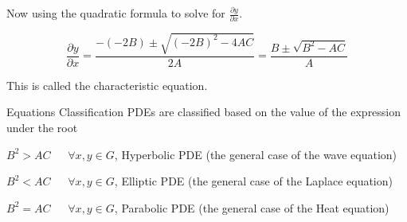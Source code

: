 \documentclass[]{article}
\begin{document}
Now using the quadratic formula to solve for $\displaystyle \frac{\partial y}{\partial x}$.

\[
    \frac{\partial y}{\partial x} = \frac{-\left(-2B\right)\pm\sqrt{{(-2B)}^2 -4AC}}{2A} = \frac{B\pm\sqrt{B^2 -AC}}{A}    
\]

This is called the characteristic equation.

\begin{enrichment*}{Equations Classification}
PDEs are classified based on the value of the expression under the root

$B^2 > AC \quad\;\; \forall x,y\in G$, Hyperbolic PDE (the general case of the wave equation) 

$B^2 < AC \quad\;\; \forall x,y\in G$, Elliptic PDE (the general case of the Laplace equation) 

$B^2 = AC \quad\;\; \forall x,y\in G$, Parabolic PDE (the general case of the Heat equation) 
\end{enrichment*}
\end{document}
